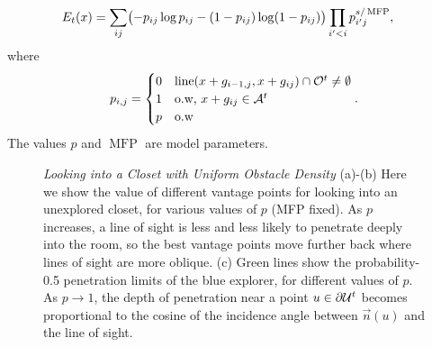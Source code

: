 \begin{align}
E_t(x)&=\sum_{ij} \bigl(-p_{ij}\log p_{ij} - (1-p_{ij})\log (1-p_{ij})\bigr) \prod_{i^{\prime}<i} p_{i^{\prime}j}^{s/\operatorname{MFP}},
\end{align}
where
$$p_{i,j} = \begin{cases}
0 & \operatorname{line}(x+g_{i-1,j}, x+g_{ij}) \cap \mathcal{O}^t \neq \emptyset \\
1 & \text{o.w, } x+g_{ij}\in\mathcal{A}^t\\
p & \text{o.w}
\end{cases}.$$
The values $p$ and $\operatorname{MFP}$ are model parameters.

\def\n{\vec{n}}
\begin{figure}
\centering
{}
\caption{\emph{Looking into a Closet with Uniform Obstacle Density}
(a)-(b) Here we show the value of different vantage points
for looking into an unexplored closet, 
for various values of $p$ (MFP fixed).
As $p$ increases, a line of sight is less and less likely to 
penetrate deeply into the room, so the 
best vantage points move further back where 
lines of sight are more oblique.
(c) Green lines show the probability-0.5 penetration limits of
the blue explorer, for different values of $p$.  
As $p\to 1$, the depth of penetration near a point $u\in\partial\mathcal{U}^t$ 
becomes proportional to the cosine of the incidence angle
between $\n(u)$ and the line of sight.
}
\end{figure}
